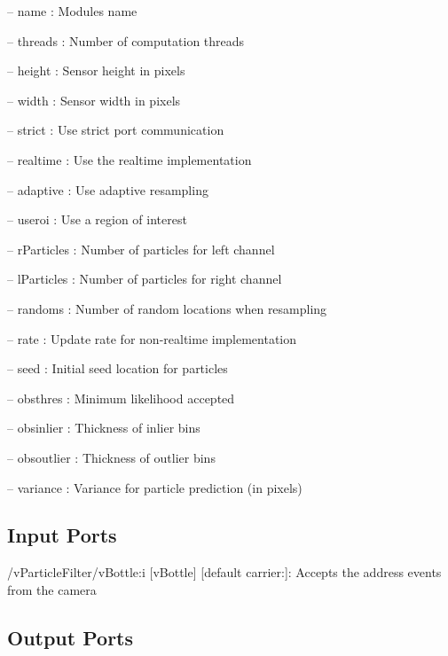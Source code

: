 \begin{DoxyItemize}
\item -- name \+: Modules name
\item -- threads \+: Number of computation threads
\item -- height \+: Sensor height in pixels
\item -- width \+: Sensor width in pixels
\item -- strict \+: Use strict port communication
\item -- realtime \+: Use the realtime implementation
\item -- adaptive \+: Use adaptive resampling
\item -- useroi \+: Use a region of interest
\item -- r\+Particles \+: Number of particles for left channel
\item -- l\+Particles \+: Number of particles for right channel
\item -- randoms \+: Number of random locations when resampling
\item -- rate \+: Update rate for non-\/realtime implementation
\item -- seed \+: Initial seed location for particles
\item -- obsthres \+: Minimum likelihood accepted
\item -- obsinlier \+: Thickness of inlier bins
\item -- obsoutlier \+: Thickness of outlier bins
\item -- variance \+: Variance for particle prediction (in pixels) 
\end{DoxyItemize}\hypertarget{group__zynqGrabber_inputports_sec}{}\subsection{Input Ports}\label{group__zynqGrabber_inputports_sec}

\begin{DoxyItemize}
\item /v\+Particle\+Filter/v\+Bottle\+:i \mbox{[}v\+Bottle\mbox{]} \mbox{[}default carrier\+:\mbox{]}\+: Accepts the address events from the camera
\end{DoxyItemize}\hypertarget{group__zynqGrabber_outputports_sec}{}\subsection{Output Ports}\label{group__zynqGrabber_outputports_sec}

